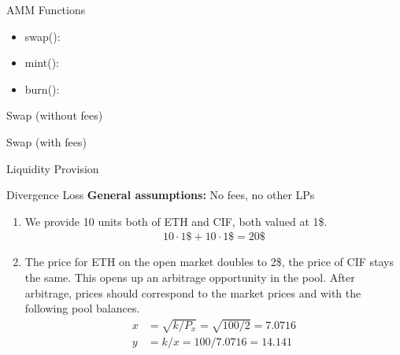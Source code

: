 \documentclass[]{beamer}
\begin{document}
\begin{frame}{AMM Functions}
	\begin{itemize}
		\item<1-> swap():
		\item<2-> mint():
		\item<3-> burn(): 
	\end{itemize}
\end{frame}

\begin{frame}{Swap (without fees)}
	\only<1>{
		\begin{figure}[h!]
			\begin{center}
				
			\end{center}
		\end{figure}
	}


\end{frame}


\begin{frame}{Swap (with fees)}
	
\end{frame}


\begin{frame}{Liquidity Provision}

\end{frame}


\begin{frame}{Divergence Loss}
		\textbf{General assumptions:} No fees, no other LPs \\ 
		
		\begin{enumerate}
			\item We provide 10 units both of ETH and CIF, both valued at 1\$.
			\begin{align*}
			10 \cdot 1\$ + 10 \cdot 1\$ = 20 \$	
			\end{align*}
			\item The price for ETH on the open market doubles to 2\$, the price of CIF stays the same. This opens up an arbitrage opportunity in the pool. After arbitrage, prices should correspond  to the market prices and with the following pool balances.
			\begin{align*}
			x &= \sqrt{k/P_{x}}	 = \sqrt{100/2} = 7.0716 \\
			y &= k / x = 100 / 7.0716 = 14.141
			\end{align*}
		\end{enumerate}
		
\end{frame}
\end{document}
